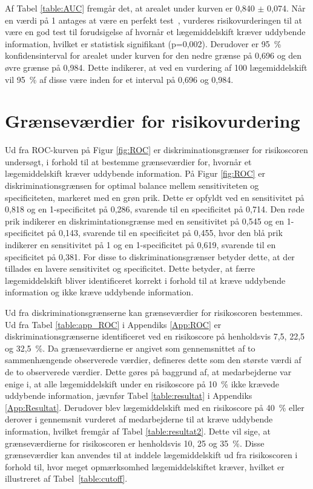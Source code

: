 Af Tabel \ref{table:AUC} fremgår det, at arealet under kurven er 0,840 $\pm$ 0,074. Når en værdi på 1 antages at være en perfekt test~\citep{Greiner2000}, vurderes risikovurderingen til at være en god test til forudsigelse af hvornår et lægemiddelskift kræver uddybende information, hvilket er statistisk signifikant (p=0,002). Derudover er 95~\% konfidensinterval for arealet under kurven for den nedre grænse på 0,696 og den øvre grænse på 0,984. Dette indikerer, at ved en vurdering af 100 lægemiddelskift vil 95~\% af disse være inden for et interval på 0,696 og 0,984.

\section{Grænseværdier for risikovurdering}
Ud fra ROC-kurven på Figur \ref{fig:ROC}  er diskriminationsgrænser for risikoscoren undersøgt, i forhold til at bestemme grænseværdier for, hvornår et lægemiddelskift kræver uddybende information. På Figur \ref{fig:ROC} er diskriminationsgrænsen for optimal balance mellem sensitiviteten og specificiteten, markeret med en grøn prik. Dette er opfyldt ved en sensitivitet på 0,818 og en 1-specificitet på 0,286, svarende til en specificitet på 0,714. Den røde prik indikerer en diskrimintationsgrænse med en sensitivitet på 0,545 og en 1-specificitet på 0,143, svarende til en specificitet på 0,455, hvor den blå prik indikerer en sensitivitet på 1 og en 1-specificitet på 0,619, svarende til en specificitet på 0,381. For disse to diskriminationsgrænser betyder dette, at der tillades en lavere sensitivitet og specificitet. Dette betyder, at færre lægemiddelskift bliver identificeret korrekt i forhold til at kræve uddybende information og ikke kræve uddybende information.


Ud fra diskriminationsgrænserne kan grænseværdier for risikoscoren bestemmes. Ud fra Tabel \ref{table:app_ROC} i Appendiks \ref{App:ROC} er diskriminationsgrænserne identificeret ved en risikoscore på  henholdsvis 7,5, 22,5 og 32,5~\%. Da grænseværdierne er angivet som gennemsnittet af to sammenhængende observerede værdier, defineres dette som den største værdi af de to observerede værdier. Dette gøres på baggrund af, at medarbejderne var enige i, at alle lægemiddelskift under en risikoscore på 10~\% ikke krævede uddybende information, jævnfør Tabel \ref{table:resultat} i Appendiks \ref{App:Resultat}. Derudover blev
lægemiddelskift med en risikoscore på 40~\% eller derover i gennemsnit vurderet af medarbejderne til at kræve uddybende information, hvilket fremgår af Tabel \ref{table:resultat2}. Dette vil sige, at grænseværdierne for risikoscoren er henholdsvis 10, 25 og 35~\%. Disse grænseværdier kan anvendes til at inddele lægemiddelskift ud fra risikoscoren i forhold til, hvor meget opmærksomhed lægemiddelskiftet kræver, hvilket er illustreret af Tabel~\ref{table:cutoff}.

